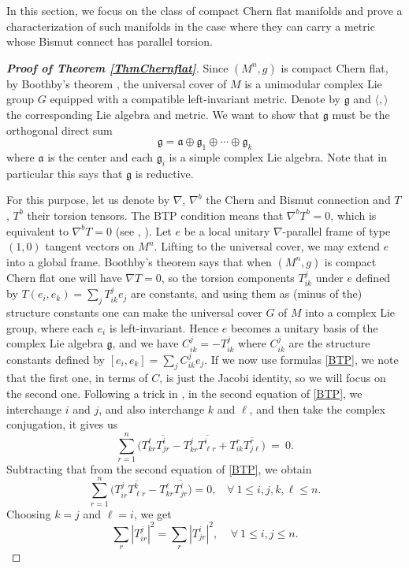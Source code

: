 \documentclass{amsart}
\numberwithin{equation}{section}
\theoremstyle{definition}
\renewcommand{\1}{\mathds{1}}
\renewcommand{\>}{\rightarrow}
\begin{document}
In this section, we  focus on the class of compact Chern flat manifolds and prove a characterization of such manifolds in the case where they can carry a metric whose Bismut connect has parallel torsion.

\begin{proof}[{\bf Proof of Theorem \ref{ThmChernflat}}] Since $(M^n,g)$ is compact Chern flat, by Boothby's theorem \cite{Boothby}, the universal cover  of $M$ is a unimodular complex Lie group $G$ equipped with a compatible left-invariant metric. Denote by $\mathfrak g$ and $\langle , \rangle $ the corresponding Lie algebra and metric. We want to show that $\mathfrak g$ must be the orthogonal direct sum
\begin{equation}
 {\mathfrak g} = {\mathfrak a} \oplus {\mathfrak g}_1 \oplus \cdots \oplus {\mathfrak g}_k \label{eq:decom}
 \end{equation}
where $\mathfrak a$ is the center and each ${\mathfrak g}_i$ is a simple complex Lie algebra.  Note that in particular this says that  $\mathfrak g$ is reductive.

For this purpose, let us denote by $\nabla$, $\nabla^b$  the Chern and Bismut connection and $T$, $T^b$  their torsion tensors. The {\rm BTP}
 condition means that $\nabla^bT^b=0$, which is equivalent to $\nabla^bT=0$ (see \cite{ZhaoZ19Str}, \cite{ZhaoZ22}). Let $e$ be a local unitary $\nabla$-parallel frame of type $(1,0)$ tangent vectors on $M^n$. Lifting to the universal cover, we may extend $e$ into a global frame.
Boothby's theorem says that when $(M^n,g)$  is compact Chern flat one will have $\nabla T=0$, so the torsion components $T^j_{ik}$ under $e$ defined by $T(e_i,e_k)=\sum_j T^j_{ik}e_j$ are constants, and using them as (minus of the) structure constants one can make the universal cover $G$ of $M$ into a complex Lie group, where each $e_i$ is left-invariant. Hence  $e$ becomes a unitary basis of the complex Lie algebra ${\mathfrak g}$, and we have $C^j_{ik}=-T^j_{ik}$ where $C^j_{ik}$ are the structure constants defined by  $[e_i,e_k]=\sum_j C^j_{ik} e_j$.
 If we now use formulas \eqref{BTP}, we note that the first one, in terms of $C$, is just the Jacobi identity, so we will focus on the second one. Following a trick in  \cite{ZhaoZ22}, in the second equation of \eqref{BTP}, we interchange $i$ and $j$, and also interchange $k$ and $\ell$, and then take the complex conjugation, it gives us
$$ \sum_{r=1}^n \big( T^{\ell}_{kr} \overline{ T^i_{jr} } - T^{j}_{kr} \overline{ T^i_{\ell r} } + T^{r}_{ik} \overline{ T^r_{j\ell } } \big) \ = \ 0 .$$
Subtracting that from the second equation of \eqref{BTP}, we obtain
$$ \sum_{r=1}^n \big(  T^{j}_{ir} \overline{ T^k_{\ell r} } -  T^{\ell}_{kr} \overline{ T^i_{jr} }  \big) = 0, \ \ \ \ \forall \ 1\leq i,j,k,\ell \leq n. $$
Choosing $k=j$ and $\ell =i$, we get
\begin{equation}
\sum_r |T^j_{ir}|^2 = \sum_r |T^i_{jr}|^2 , \ \ \ \ \ \forall \ 1\leq i,j\leq n. \label{eq:BTP2}
\end{equation}


\end{proof}
\end{document}
